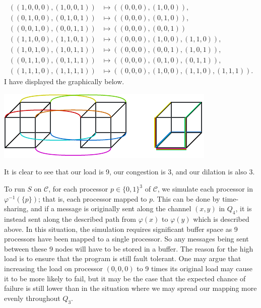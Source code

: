 \begin{parts}
\begin{solution}
\begin{enumerate}
        {\small
          \begin{align*}
            ((1,0,0,0), (1,0,0,1)) &\mapsto ((0,0,0), (1,0,0)), \\
            ((0,1,0,0), (0,1,0,1)) &\mapsto ((0,0,0), (0,1,0)), \\
            ((0,0,1,0), (0,0,1,1)) &\mapsto ((0,0,0), (0,0,1)) \\
            ((1,1,0,0), (1,1,0,1)) &\mapsto ((0,0,0), (1,0,0), (1,1,0)), \\
            ((1,0,1,0), (1,0,1,1)) &\mapsto ((0,0,0), (0,0,1), (1,0,1)), \\
            ((0,1,1,0), (0,1,1,1)) &\mapsto ((0,0,0), (0,1,0), (0,1,1)), \\
            ((1,1,1,0), (1,1,1,1)) &\mapsto ((0,0,0), (1,0,0), (1,1,0), (1,1,1)). 
          \end{align*}
        }
        I have displayed the graphically below.
        \begin{center}
          \includegraphics{q6-embedding.pdf}
        \end{center}
        It is clear to see that our load is 9, our congestion is 3, and our dilation is also 3. 
      \end{enumerate}
      To run $S$ on $\mathcal C$, for each processor $p \in \{0,1\}^3$ of $\mathcal C$, we simulate each processor in $\varphi^{-1}(\{p\})$; that is, each processor mapped to $p$. This can be done by time-sharing, and if a message is originally sent along the channel $(x,y)$ in $Q_4$, it is instead sent along the described path from $\varphi(x)$ to $\varphi(y)$ which is described above. In this situation, the simulation requires significant buffer space as 9 processors have been mapped to a single processor. So any messages being sent between these 9 nodes will have to be stored in a buffer. The reason for the high load is to ensure that the program is still fault tolerant. One may argue that increasing the load on processor $(0,0,0)$ to 9 times its original load may cause it to be more likely to fail, but it may be the case that the expected chance of failure is still lower than in the situation where we may spread our mapping more evenly throughout $Q_3$. 
    \end{solution}


\end{parts}
